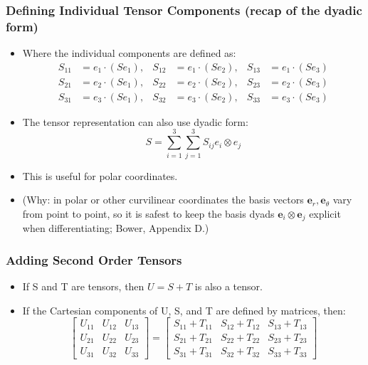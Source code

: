 \documentclass[aspectratio=169,11pt]{beamer}
\begin{document}
\begin{frame}
\frametitle{Defining Individual Tensor Components (recap of the dyadic form)}
\begin{itemize}
    \item Where the individual components are defined as: 
    \begin{align*}
        S_{11} &= e_1 \cdot (S e_1), & S_{12} &= e_1 \cdot (S e_2), & S_{13} &= e_1 \cdot (S e_3) \\
        S_{21} &= e_2 \cdot (S e_1), & S_{22} &= e_2 \cdot (S e_2), & S_{23} &= e_2 \cdot (S e_3) \\
        S_{31} &= e_3 \cdot (S e_1), & S_{32} &= e_3 \cdot (S e_2), & S_{33} &= e_3 \cdot (S e_3)
    \end{align*}
    \item The tensor representation can also use dyadic form:
    \[
    S = \sum_{i=1}^{3} \sum_{j=1}^{3} S_{ij} e_i \otimes e_j
    \]
    \item This is useful for polar coordinates.
    \item (Why: in polar or other curvilinear coordinates the basis vectors $\mathbf{e}_r,\mathbf{e}_\theta$ vary from point to point, so it is safest to keep the basis dyads $\mathbf{e}_i\otimes\mathbf{e}_j$ explicit when differentiating; Bower, Appendix D.)
\end{itemize}
\end{frame}

\begin{frame}
\frametitle{Adding Second Order Tensors}
\begin{itemize}
    \item If S and T are tensors, then \(U = S + T\) is also a tensor. 
    \item If the Cartesian components of U, S, and T are defined by matrices, then: 
    \[
    \begin{bmatrix}
        U_{11} & U_{12} & U_{13} \\
        U_{21} & U_{22} & U_{23} \\
        U_{31} & U_{32} & U_{33}
    \end{bmatrix} =
    \begin{bmatrix}
        S_{11} + T_{11} & S_{12} + T_{12} & S_{13} + T_{13} \\
        S_{21} + T_{21} & S_{22} + T_{22} & S_{23} + T_{23} \\
        S_{31} + T_{31} & S_{32} + T_{32} & S_{33} + T_{33}
    \end{bmatrix}
    \]
\end{itemize}
\end{frame}
\end{document}
